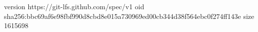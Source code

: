 version https://git-lfs.github.com/spec/v1
oid sha256:bbc69af6e98fbf990d8cbd8e015a730969ed00cb344d38f564ebc0f274ff143e
size 1615698
